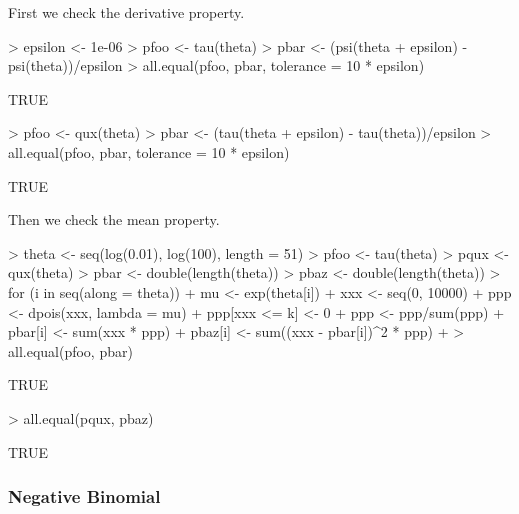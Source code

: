 \documentclass[11pt]{article}
\begin{document}
First we check the derivative property.
\begin{Schunk}
\begin{Sinput}
> epsilon <- 1e-06
> pfoo <- tau(theta)
> pbar <- (psi(theta + epsilon) - psi(theta))/epsilon
> all.equal(pfoo, pbar, tolerance = 10 * epsilon)
\end{Sinput}
\begin{Soutput}
[1] TRUE
\end{Soutput}
\begin{Sinput}
> pfoo <- qux(theta)
> pbar <- (tau(theta + epsilon) - tau(theta))/epsilon
> all.equal(pfoo, pbar, tolerance = 10 * epsilon)
\end{Sinput}
\begin{Soutput}
[1] TRUE
\end{Soutput}
\end{Schunk}

Then we check the mean property.
\begin{Schunk}
\begin{Sinput}
> theta <- seq(log(0.01), log(100), length = 51)
> pfoo <- tau(theta)
> pqux <- qux(theta)
> pbar <- double(length(theta))
> pbaz <- double(length(theta))
> for (i in seq(along = theta)) {
+     mu <- exp(theta[i])
+     xxx <- seq(0, 10000)
+     ppp <- dpois(xxx, lambda = mu)
+     ppp[xxx <= k] <- 0
+     ppp <- ppp/sum(ppp)
+     pbar[i] <- sum(xxx * ppp)
+     pbaz[i] <- sum((xxx - pbar[i])^2 * ppp)
+ }
> all.equal(pfoo, pbar)
\end{Sinput}
\begin{Soutput}
[1] TRUE
\end{Soutput}
\begin{Sinput}
> all.equal(pqux, pbaz)
\end{Sinput}
\begin{Soutput}
[1] TRUE
\end{Soutput}
\end{Schunk}

\subsubsection{Negative Binomial}
\end{document}
